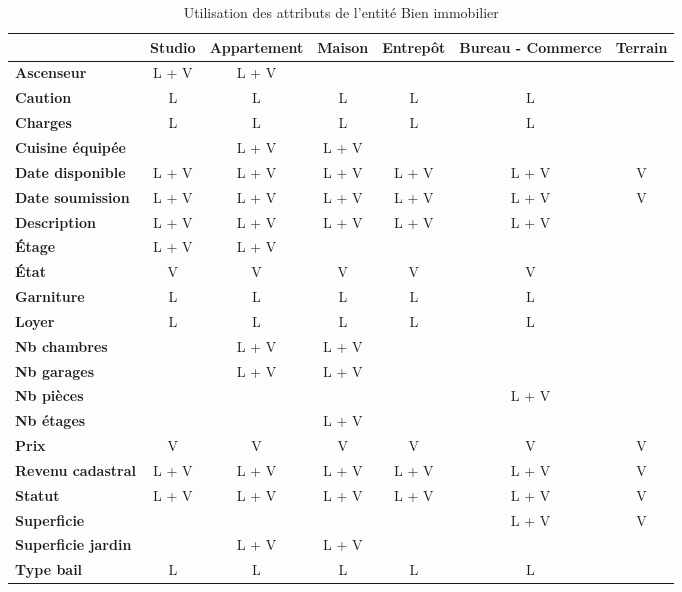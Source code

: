 \begin{table}
  \begin{tabular}{|l|c|c|c|c|c|c|}
  \hline
  \rowcolor{gray05} \multicolumn{1}{|c|}{\textbf{Attribut}} & \multicolumn{1}{|c|}{\textbf{Studio}} & \multicolumn{1}{|c|}{\textbf{Appartement}} & \multicolumn{1}{|c|}{\textbf{Maison}} & \multicolumn{1}{|c|}{\textbf{Entrepôt}} & \multicolumn{1}{|c|}{\textbf{Bureau - Commerce}} & \multicolumn{1}{|c|}{\textbf{Terrain}} \\
  \hline
  \hline
  \textbf{Ascenseur} & L + V & L + V &  &  &  &  \\
  \hline
  \textbf{Caution} & L & L & L & L & L &  \\
  \hline
  \textbf{Charges} & L & L & L & L & L &  \\
  \hline
  \textbf{Cuisine équipée} &  & L + V & L + V &  &  &  \\
  \hline
  \textbf{Date disponible} & L + V & L + V & L + V & L + V & L + V & V \\
  \hline
  \textbf{Date soumission} & L + V & L + V & L + V & L + V & L + V & V \\
  \hline
  \textbf{Description} & L + V & L + V & L + V & L + V & L + V &  \\
  \hline
  \textbf{Étage} & L + V & L + V &  &  &  &  \\
  \hline
  \textbf{État} & V & V & V & V & V &  \\
  \hline
  \textbf{Garniture} & L & L & L & L & L &  \\
  \hline
  \textbf{Loyer} & L & L & L & L & L &  \\
  \hline
  \textbf{Nb chambres} &  & L + V & L + V &  &  &  \\
  \hline
  \textbf{Nb garages} &  & L + V & L + V &  &  &  \\
  \hline
  \textbf{Nb pièces} &  &  &  &  & L + V &  \\
 \hline
  \textbf{Nb étages} &  &  & L + V &  &  &  \\
  \hline
  \textbf{Prix} & V & V & V & V & V & V \\
  \hline
  \textbf{Revenu cadastral} & L + V & L + V & L + V & L + V & L + V & V \\
  \hline
  \textbf{Statut} & L + V & L + V & L + V & L + V & L + V & V \\
  \hline
  \textbf{Superficie} &  &  &  &  & L + V  & V \\
  \hline
  \textbf{Superficie jardin} &  & L + V & L + V &  &  &  \\
  \hline
  \textbf{Type bail} & L & L & L & L & L &  \\
  \hline
  \end{tabular}
  \caption{Utilisation des attributs de l'entité \og{}Bien immobilier\fg{}}
  \label{tbl_usage_attribut_bien_immobilier}
\end{table}


